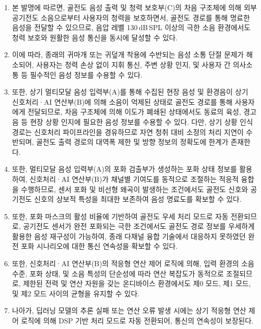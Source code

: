 \documentclass{article}
\DeclareRobustCommand{\codexedit}[1]{\textcolor{customorange}{#1}}
\begin{document}
\begin{enumerate}[label = \textbf{(\arabic*)}]

    \item 본 발명에 따르면, 골전도 음성 출력 및 청력 보호부(C)의 차음 구조체에 의해 외부 공기전도 소음으로부터 사용자의 청력을 보호하면서, 골전도 경로를 통해 명료한 음성을 전달할 수 있으므로, 음압 레벨 130\,dB\,SPL 이상의 극한 소음 환경에서도 청력 보호와 원활한 음성 통신을 동시에 달성할 수 있다. 
    
    \item 이에 따라, 종래의 귀마개 또는 귀덮개 착용에 수반되는 음성 소통 단절 문제가 해소되어, 사용자는 청력 손상 없이 지휘 통신, 주변 상황 인지, 및 사용자 간 의사소통 등 필수적인 음성 정보를 수용할 수 있다.

    \item 또한, 상기 멀티모달 음성 입력부(A)를 통해 수집된 현장 음성 및 환경음이 상기 신호처리·AI 연산부(B)에 의해 소음이 억제된 상태로 골전도 경로를 통해 사용자에게 전달되므로, 차음 구조체에 의해 이도가 폐쇄된 상태에서도 동료의 육성, 경고음 등 현장 상황 인지에 필요한 음성 정보를 수용할 수 있다. 다만, 상기 상황 인식 경로는 신호처리 파이프라인을 경유하므로 자연 청취 대비 소정의 처리 지연이 수반되며, 골전도 출력 경로의 대역폭 제한 및 방향 정보의 정확도에 한계가 존재한다.
    

    \item \codexedit{또한, 멀티모달 음성 입력부(A)의 포화 검출부가 생성하는 포화 상태 정보를 활용하여, 신호처리·AI 연산부(B)가 채널별 기여도를 동적으로 조절하는 적응적 융합을 수행하므로, 센서 포화 및 비선형 왜곡이 발생하는 조건에서도 골전도 신호와 공기전도 신호의 상보적 특성을 최대한 보존하여 음성 명료도를 확보할 수 있다.}

    \item \codexedit{또한, 포화 마스크의 활성 비율에 기반하여 골전도 우세 처리 모드로 자동 전환되므로, 공기전도 센서가 완전 포화되는 극한 조건에서도 골전도 경로 정보를 우세하게 활용한 음성 재구성이 가능하여, 종래 다채널 융합 기술에서 대응하지 못하였던 완전 포화 시나리오에 대한 통신 연속성을 확보할 수 있다.}
    
    \item \codexedit{또한, 신호처리·AI 연산부(B)의 적응형 연산 제어 로직에 의해, 입력 환경의 소음 수준, 포화 상태, 및 소음 특성의 단순성에 따라 연산 복잡도가 동적으로 조절되므로, 제한된 전력 및 연산 자원을 갖는 온디바이스 환경에서도 제0 모드, 제1 모드, 및 제2 모드 사이의 균형을 유지할 수 있다.}

    \item 나아가, 딥러닝 모델의 추론 실패 또는 연산 오류 발생 시에는 상기 적응형 연산 제어 로직에 의해 DSP 기반 처리 모드로 자동 전환되어, 통신의 연속성이 보장된다.


\end{enumerate}
\end{document}
